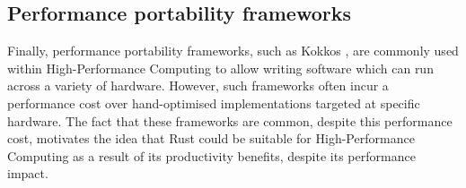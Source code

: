 

%     

%     




\subsection{Performance portability frameworks}
\label{ssec:performance-portability-frameworks-results}

Finally, performance portability frameworks, such as Kokkos \cite{KokkosEcosystem}, are commonly used within High-Performance Computing to allow writing software which can run across a variety of hardware. However, such frameworks often incur a performance cost over hand-optimised implementations targeted at specific hardware. The fact that these frameworks are common, despite this performance cost, motivates the idea that Rust could be suitable for High-Performance Computing as a result of its productivity benefits, despite its performance impact.

